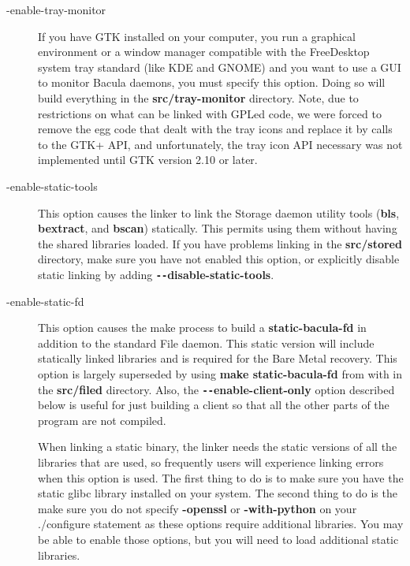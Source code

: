 \begin{description}
\item [ {-}{\-}enable-tray-monitor ]
   If you have GTK installed on your computer, you run a graphical
   environment or a window manager compatible with the FreeDesktop system
   tray standard (like KDE and GNOME) and you want to use a GUI to monitor
   Bacula daemons, you must specify this option.  Doing so will build
   everything in the {\bf src/tray-monitor} directory. Note, due to 
   restrictions on what can be linked with GPLed code, we were forced to
   remove the egg code that dealt with the tray icons and replace it by
   calls to the GTK+ API, and unfortunately, the tray icon API necessary
   was not implemented until GTK version 2.10 or later.

\item [ {-}{\-}enable-static-tools]
   This option causes the linker to link the Storage daemon utility tools
   ({\bf bls}, {\bf bextract}, and {\bf bscan}) statically.  This permits
   using them without having the shared libraries loaded.  If you have
   problems linking in the {\bf src/stored} directory, make sure you have
   not enabled this option, or explicitly disable static linking by adding
   {\bf \verb:--:disable-static-tools}.

\item [ {-}{\-}enable-static-fd]
   This option causes the make process to build a {\bf static-bacula-fd} in
   addition to the standard File daemon.  This static version will include
   statically linked libraries and is required for the Bare Metal recovery.
   This option is largely superseded by using {\bf make static-bacula-fd}
   from with in the {\bf src/filed} directory.  Also, the {\bf
   \verb:--:enable-client-only} option described below is useful for just
   building a client so that all the other parts of the program are not
   compiled.   
     
   When linking a static binary, the linker needs the static versions
   of all the libraries that are used, so frequently users will 
   experience linking errors when this option is used. The first 
   thing to do is to make sure you have the static glibc library 
   installed on your system. The second thing to do is the make sure
   you do not specify {\bf {-}{\-}openssl} or {\bf {-}{\-}with-python}
   on your ./configure statement as these options require additional
   libraries. You may be able to enable those options, but you will
   need to load additional static libraries.



\end{description}
